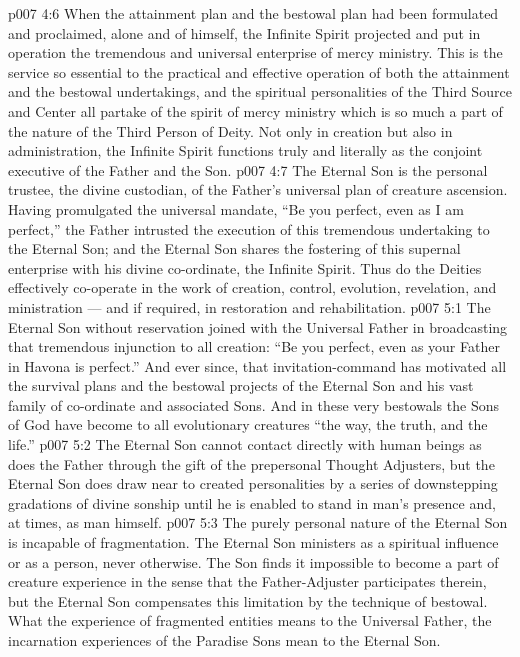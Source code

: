 \vs p007 4:6 \pc {}\bibnobreakspace {} When the attainment plan and the bestowal plan had been formulated and proclaimed, alone and of himself, the Infinite Spirit projected and put in operation the tremendous and universal enterprise of mercy ministry. This is the service so essential to the practical and effective operation of both the attainment and the bestowal undertakings, and the spiritual personalities of the Third Source and Center all partake of the spirit of mercy ministry which is so much a part of the nature of the Third Person of Deity. Not only in creation but also in administration, the Infinite Spirit functions truly and literally as the conjoint executive of the Father and the Son.
\vs p007 4:7 \pc The Eternal Son is the personal trustee, the divine custodian, of the Father’s universal plan of creature ascension. Having promulgated the universal mandate, “Be you perfect, even as I am perfect,” the Father intrusted the execution of this tremendous undertaking to the Eternal Son; and the Eternal Son shares the fostering of this supernal enterprise with his divine co\hyp{}ordinate, the Infinite Spirit. Thus do the Deities effectively co\hyp{}operate in the work of creation, control, evolution, revelation, and ministration --- and if required, in restoration and rehabilitation.
\vs p007 5:1 The Eternal Son without reservation joined with the Universal Father in broadcasting that tremendous injunction to all creation: “Be you perfect, even as your Father in Havona is perfect.” And ever since, that invitation\hyp{}command has motivated all the survival plans and the bestowal projects of the Eternal Son and his vast family of co\hyp{}ordinate and associated Sons. And in these very bestowals the Sons of God have become to all evolutionary creatures “the way, the truth, and the life.”
\vs p007 5:2 \pc The Eternal Son cannot contact directly with human beings as does the Father through the gift of the prepersonal Thought Adjusters, but the Eternal Son does draw near to created personalities by a series of downstepping gradations of divine sonship until he is enabled to stand in man’s presence and, at times, as man himself.
\vs p007 5:3 The purely personal nature of the Eternal Son is incapable of fragmentation. The Eternal Son ministers as a spiritual influence or as a person, never otherwise. The Son finds it impossible to become a part of creature experience in the sense that the Father\hyp{}Adjuster participates therein, but the Eternal Son compensates this limitation by the technique of bestowal. What the experience of fragmented entities means to the Universal Father, the incarnation experiences of the Paradise Sons mean to the Eternal Son.
